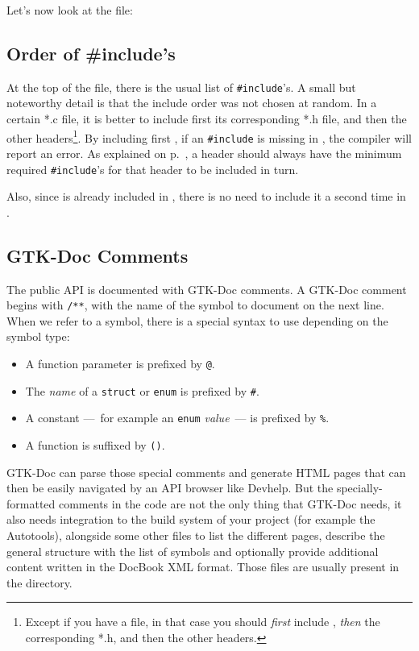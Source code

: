 Let's now look at the  file:

\vspace{0.7cm}


\subsection{Order of \#include's}
At the top of the file, there is the usual list of \lstinline{#include}'s. A small but noteworthy detail is that the include order was not chosen at random. In a certain *.c file, it is better to include first its corresponding *.h file, and then the other headers\footnote{Except if you have a  file, in that case you should \emph{first} include , \emph{then} the corresponding *.h, and then the other headers.}. By including first , if an \lstinline{#include} is missing in , the compiler will report an error. As explained on p.~\pageref{oop-semi-include-in-header}, a header should always have the minimum required \lstinline{#include}'s for that header to be included in turn.

Also, since  is already included in , there is no need to include it a second time in .

\subsection{GTK-Doc Comments}
The public API is documented with GTK-Doc comments. A GTK-Doc comment begins with \lstinline{/**}, with the name of the symbol to document on the next line. When we refer to a symbol, there is a special syntax to use depending on the symbol type:
\begin{itemize}
  \item A function parameter is prefixed by \lstinline{@}.
  \item The \emph{name} of a \lstinline{struct} or \lstinline{enum} is prefixed by \lstinline{#}.
  \item A constant ---~for example an \lstinline{enum} \emph{value}~--- is prefixed by \lstinline{%}.
  \item A function is suffixed by \lstinline{()}.
\end{itemize}

GTK-Doc can parse those special comments and generate HTML pages that can then be easily navigated by an API browser like Devhelp. But the specially-formatted comments in the code are not the only thing that GTK-Doc needs, it also needs integration to the build system of your project (for example the Autotools), alongside some other files to list the different pages, describe the general structure with the list of symbols and optionally provide additional content written in the DocBook XML format. Those files are usually present in the  directory.

